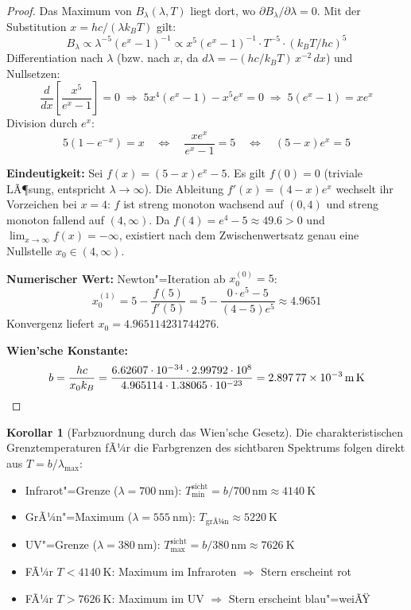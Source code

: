 ﻿\documentclass[a4paper,12pt]{article}
\theoremstyle{definition}
\newtheorem{korollar}{Korollar}
\begin{document}
\begin{proof}
    Das Maximum von $B_\lambda(\lambda, T)$ liegt dort, wo
    $\partial B_\lambda / \partial\lambda = 0$. Mit der Substitution
    $x = hc/(\lambda k_B T)$ gilt:
    \[
        B_\lambda \propto \lambda^{-5}(e^x-1)^{-1}
        \propto x^5 (e^x-1)^{-1} \cdot T^{-5} \cdot (k_BT/hc)^5
    \]
    Differentiation nach $\lambda$ (bzw. nach $x$, da
    $d\lambda = -(hc/k_BT)\,x^{-2}\,dx$) und Nullsetzen:
    \[
        \frac{d}{dx}\!\left[\frac{x^5}{e^x-1}\right] = 0
        \;\Longrightarrow\;
        5x^4(e^x-1) - x^5 e^x = 0
        \;\Longrightarrow\;
        5(e^x-1) = x e^x
    \]
    Division durch $e^x$:
    \[
        5(1 - e^{-x}) = x
        \quad\Longleftrightarrow\quad
        \frac{x e^x}{e^x - 1} = 5
        \quad\Longleftrightarrow\quad
        (5-x)e^x = 5
        \label{eq:wien_eq}
    \]

    \textbf{Eindeutigkeit:} Sei $f(x) = (5-x)e^x - 5$.
    Es gilt $f(0) = 0$ (triviale LÃ¶sung, entspricht $\lambda \to \infty$).
    Die Ableitung $f'(x) = (4-x)e^x$ wechselt ihr Vorzeichen bei $x = 4$:
    $f$ ist streng monoton wachsend auf $(0,4)$ und streng monoton fallend
    auf $(4,\infty)$. Da $f(4) = e^4 - 5 \approx 49.6 > 0$ und
    $\lim_{x\to\infty} f(x) = -\infty$, existiert nach dem Zwischenwertsatz
    genau eine Nullstelle $x_0 \in (4,\infty)$.

    \textbf{Numerischer Wert:} Newton"=Iteration ab $x_0^{(0)} = 5$:
    \[
        x_0^{(1)} = 5 - \frac{f(5)}{f'(5)} = 5 - \frac{0 \cdot e^5 - 5}{(4-5)e^5}
        \approx 4.9651
    \]
    Konvergenz liefert $x_0 = 4.965114231744276$.

    \textbf{Wien'sche Konstante:}
    \[
        b = \frac{hc}{x_0 k_B}
        = \frac{6.62607\cdot10^{-34} \cdot 2.99792\cdot10^8}
               {4.965114 \cdot 1.38065\cdot10^{-23}}
        = \SI{2.89777e-3}{\metre\kelvin} \qedhere
    \]
\end{proof}

\begin{korollar}[Farbzuordnung durch das Wien'sche Gesetz]
\label{kor:farbe}
    Die charakteristischen Grenztemperaturen fÃ¼r die Farbgrenzen des
    sichtbaren Spektrums folgen direkt aus $T = b/\lambda_{\max}$:
    \begin{itemize}
        \item Infrarot"=Grenze ($\lambda = \SI{700}{\nano\metre}$):
              $T_{\min}^{\text{sicht}} = b/700\,\text{nm} \approx \SI{4140}{\kelvin}$
        \item GrÃ¼n"=Maximum ($\lambda = \SI{555}{\nano\metre}$):
              $T_{\text{grÃ¼n}} \approx \SI{5220}{\kelvin}$
        \item UV"=Grenze ($\lambda = \SI{380}{\nano\metre}$):
              $T_{\max}^{\text{sicht}} = b/380\,\text{nm} \approx \SI{7626}{\kelvin}$
        \item FÃ¼r $T < \SI{4140}{\kelvin}$: Maximum im Infraroten
              $\Rightarrow$ Stern erscheint rot
        \item FÃ¼r $T > \SI{7626}{\kelvin}$: Maximum im UV
              $\Rightarrow$ Stern erscheint blau"=weiÃŸ
    \end{itemize}
\end{korollar}
\end{document}
